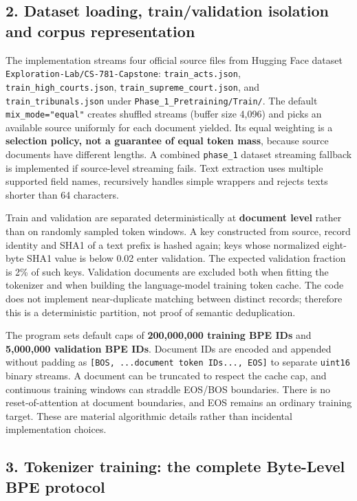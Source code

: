 \subsection{2. Dataset loading, train/validation isolation and corpus
representation}\label{dataset-loading-trainvalidation-isolation-and-corpus-representation}

The implementation streams four official source files from Hugging Face
dataset \texttt{Exploration-Lab/CS-781-Capstone}:
\texttt{train\_acts.json}, \texttt{train\_high\_courts.json},
\texttt{train\_supreme\_court.json}, and \texttt{train\_tribunals.json}
under \texttt{Phase\_1\_Pretraining/Train/}. The default
\texttt{mix\_mode="equal"} creates shuffled streams (buffer size 4,096)
and picks an available source uniformly for each document yielded. Its
equal weighting is a \textbf{selection policy, not a guarantee of equal
token mass}, because source documents have different lengths. A combined
\texttt{phase\_1} dataset streaming fallback is implemented if
source-level streaming fails. Text extraction uses multiple supported
field names, recursively handles simple wrappers and rejects texts
shorter than 64 characters.

Train and validation are separated deterministically at \textbf{document
level} rather than on randomly sampled token windows. A key constructed
from source, record identity and SHA1 of a text prefix is hashed again;
keys whose normalized eight-byte SHA1 value is below 0.02 enter
validation. The expected validation fraction is 2\% of such keys.
Validation documents are excluded both when fitting the tokenizer and
when building the language-model training token cache. The code does not
implement near-duplicate matching between distinct records; therefore
this is a deterministic partition, not proof of semantic deduplication.

The program sets default caps of \textbf{200,000,000 training BPE IDs}
and \textbf{5,000,000 validation BPE IDs}. Document IDs are encoded and
appended without padding as
\texttt{{[}BOS,\ ...document\ token\ IDs...,\ EOS{]}} to separate
\texttt{uint16} binary streams. A document can be truncated to respect
the cache cap, and continuous training windows can straddle EOS/BOS
boundaries. There is no reset-of-attention at document boundaries, and
EOS remains an ordinary training target. These are material algorithmic
details rather than incidental implementation choices.

\subsection{3. Tokenizer training: the complete Byte-Level BPE
protocol}\label{tokenizer-training-the-complete-byte-level-bpe-protocol}

